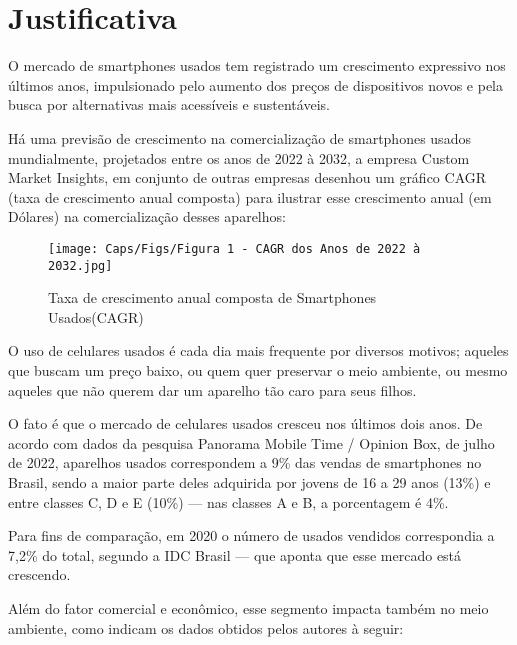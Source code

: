\chapter{Justificativa}

O mercado de smartphones usados tem registrado um crescimento expressivo
nos últimos anos, impulsionado pelo aumento dos preços de dispositivos novos e pela
busca por alternativas mais acessíveis e sustentáveis.

Há uma previsão de crescimento na comercialização de smartphones usados mundialmente, projetados entre os anos
de 2022 à 2032, a empresa Custom Market Insights, em conjunto de outras empresas
desenhou um gráfico CAGR (taxa de crescimento anual composta) para ilustrar esse crescimento
anual (em Dólares) na comercialização desses aparelhos:

\begin{figure}[!htb]
    \centering
    \caption{Taxa de crescimento anual composta de Smartphones Usados(CAGR)}
    \texttt{[image: Caps/Figs/Figura 1 - CAGR dos Anos de 2022 à 2032.jpg]}
    \label{fig:figura-exemplo1}
\end{figure}
\begin{citacao}
    O uso de celulares usados é cada dia mais frequente por diversos motivos; aqueles que buscam um preço baixo, ou quem quer preservar o meio ambiente, ou mesmo aqueles que não querem dar um aparelho tão caro para seus filhos.
    
    O fato é que o mercado de celulares usados cresceu nos últimos dois anos. De acordo com dados da pesquisa Panorama Mobile Time / Opinion Box, de julho de 2022, aparelhos usados correspondem a 9\% das vendas de smartphones no Brasil, sendo a maior parte deles adquirida por jovens de 16 a 29 anos (13\%) e entre classes C, D e E (10\%) — nas classes A e B, a porcentagem é 4\%.
    
    Para fins de comparação, em 2020 o número de usados vendidos correspondia a 7,2\% do total, segundo a IDC Brasil — que aponta que esse mercado está crescendo.
    \end{citacao}
    

    \break
    Além do fator comercial e econômico, esse segmento impacta também no meio ambiente, como indicam os dados obtidos pelos autores à seguir:
    
